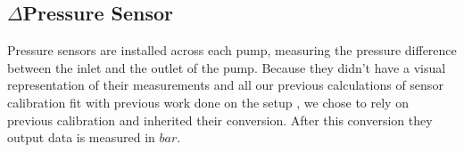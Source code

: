 \subsection*{$\Delta$Pressure Sensor}
Pressure sensors \cite{DPT} are installed across each pump,
measuring the pressure difference between the inlet and the outlet of the pump.
Because they didn't have a visual representation of their measurements
and all our previous calculations of sensor calibration fit with previous work done on the setup \cite{Jepsen2017},
we chose to rely on previous calibration and inherited their conversion.
After this conversion they output data is measured in $bar$.